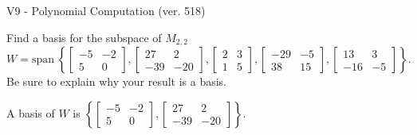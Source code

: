 \begin{exercise}
  \begin{exerciseTitle}V9 - Polynomial Computation (ver. 518)\end{exerciseTitle}
  \begin{exerciseStatement}
    Find a basis for the subspace of \(M_{2,2}\) 
\[W=\mathrm{span}\ \left\{\left[\begin{array}{cc}
-5 & -2 \\
5 & 0
\end{array}\right] , \left[\begin{array}{cc}
27 & 2 \\
-39 & -20
\end{array}\right] , \left[\begin{array}{cc}
2 & 3 \\
1 & 5
\end{array}\right] , \left[\begin{array}{cc}
-29 & -5 \\
38 & 15
\end{array}\right] , \left[\begin{array}{cc}
13 & 3 \\
-16 & -5
\end{array}\right]\right\}.\]
 Be sure to explain why your result is a basis.


  \end{exerciseStatement}
  \begin{exerciseAnswer}
   A basis of \(W\) is  \(\left\{\left[\begin{array}{cc}
-5 & -2 \\
5 & 0
\end{array}\right] , \left[\begin{array}{cc}
27 & 2 \\
-39 & -20
\end{array}\right]\right\}\).
  


  \end{exerciseAnswer}
\end{exercise}